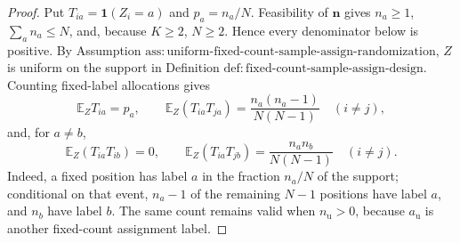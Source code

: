 \documentclass{article}
\begin{document}
\begin{proof}
Put \(T_{ia}=\mathbf 1(Z_i=a)\) and \(p_a=n_a/N\). Feasibility of \(\mathbf n\) gives \(n_a\geq1\), \(\sum_a n_a\leq N\), and, because \(K\geq2\), \(N\geq2\). Hence every denominator below is positive. By Assumption \(\mathrm{ass{:}uniform\text{-}fixed\text{-}count\text{-}sample\text{-}assign\text{-}randomization}\), \(Z\) is uniform on the support in Definition \(\mathrm{def{:}fixed\text{-}count\text{-}sample\text{-}assign\text{-}design}\). Counting fixed-label allocations gives
\[
\mathbb E_ZT_{ia}=p_a,
\qquad
\mathbb E_Z(T_{ia}T_{ja})=\frac{n_a(n_a-1)}{N(N-1)}\quad(i\ne j),
\tag{1}
\]
and, for \(a\ne b\),
\[
\mathbb E_Z(T_{ia}T_{ib})=0,
\qquad
\mathbb E_Z(T_{ia}T_{jb})=\frac{n_an_b}{N(N-1)}\quad(i\ne j).
\tag{2}
\]
Indeed, a fixed position has label \(a\) in the fraction \(n_a/N\) of the support; conditional on that event, \(n_a-1\) of the remaining \(N-1\) positions have label \(a\), and \(n_b\) have label \(b\). The same count remains valid when \(n_{\mathrm u}>0\), because \(a_{\mathrm u}\) is another fixed-count assignment label.


\end{proof}
\end{document}
